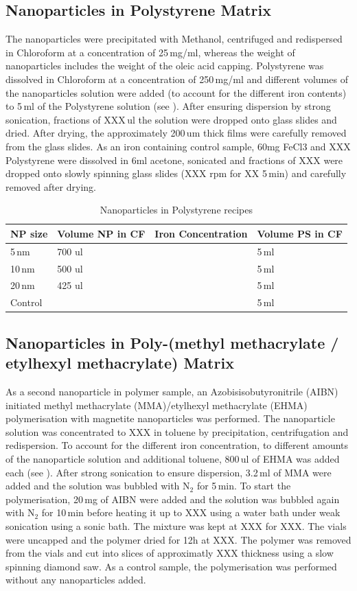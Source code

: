\subsection{Nanoparticles in Polystyrene Matrix}
The nanoparticles were precipitated with Methanol, centrifuged and redispersed in Chloroform at a concentration of 25\,mg/ml, whereas the weight of nanoparticles includes the weight of the oleic acid capping. Polystyrene was dissolved in Chloroform at a concentration of 250\,mg/ml and different volumes of the nanoparticles solution were added (to account for the different iron contents) to 5\,ml of the Polystyrene solution (see ). After ensuring dispersion by strong sonication, fractions of XXX\,ul the solution were dropped onto glass slides and dried. After drying, the approximately 200\,um thick films were carefully removed from the glass slides.
As an iron containing control sample, 60mg FeCl3 and XXX Polystyrene were dissolved in 6ml acetone, sonicated and  fractions of XXX were dropped onto slowly spinning glass slides (XXX rpm for XX 5\,min) and carefully removed after drying.
\begin{table}[tp]
	\centering
	\caption{Nanoparticles in Polystyrene recipes}
	\label{tab:samplePS}
	\begin{tabular}{llll}
		\hline
	NP size&   Volume NP in CF &  Iron Concentration &Volume PS in CF    \\
		\hline
	  5\,nm&700 ul & & 5\,ml  \\  
	   10\,nm&  500 ul& &5\,ml  \\    
	   20\,nm &  425 ul& &5\,ml  \\  
	   	Control   &  & &5\,ml  \\  
		\hline
	\end{tabular}
\end{table}

\subsection{Nanoparticles in Poly-(methyl methacrylate / etylhexyl methacrylate)  Matrix}
As a second nanoparticle in polymer sample, an Azobisisobutyronitrile (AIBN) initiated methyl methacrylate (MMA)/etylhexyl methacrylate (EHMA) polymerisation with magnetite nanoparticles was performed. 
The nanoparticle solution was concentrated to XXX in toluene by precipitation, centrifugation and redispersion. To account for the different iron concentration, to different amounts of the nanoparticle solution and additional toluene, 800\,ul of EHMA was added each (see ). After strong sonication to ensure dispersion, 3.2\,ml of MMA were added and the solution was bubbled with N$_2$ for 5\,min. To start the polymerisation, 20\,mg of AIBN were added and the solution was bubbled again with N$_2$  for 10\,min before heating it up to XXX using a water bath under weak sonication using a sonic bath. The mixture was kept at XXX for XXX.
The vials were uncapped and the polymer dried for 12h at XXX. The polymer was removed from the vials and cut into slices of approximatly XXX thickness using a slow spinning diamond saw.
As a control sample, the polymerisation was performed without any nanoparticles added.

